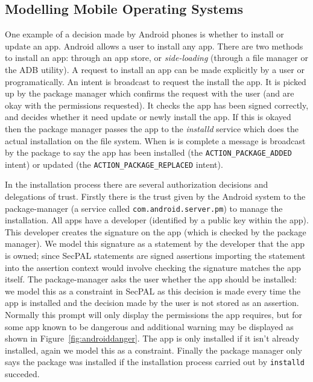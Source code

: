 \documentclass[a4paper]{article}
\begin{document}
\subsection{Modelling Mobile Operating Systems}
\label{sec:modellingmobileos}

One example of a decision made by Android phones is whether to install or update
an app.  Android allows a user to install any app.  There are two methods to
install an app: through an app store, or \emph{side-loading} (through a file
manager or the \ac{ADB} utility).  A request to install an app can be made
explicitly by a user or programatically.  An intent is broadcast to request the
install the app.  It is picked up by the package manager which confirms the
request with the user (and are okay with the permissions requested). It checks the
app has been signed correctly, and decides whether it need update or newly install
the app.  If this is okayed then the package manager passes the app to the
\emph{installd} service which does the actual installation on the file system.
When is is complete a message is broadcast by the package to say the app has
been installed (the \texttt{ACTION\_PACKAGE\_ADDED} intent) or updated (the
\texttt{ACTION\_PACKAGE\_REPLACED} intent).

In the installation process there are several authorization decisions and
delegations of trust.  Firstly there is the trust given by the Android system to
the package-manager (a service called \texttt{com.android.server.pm}) to manage
the installation.  All apps have a developer (identified by a public key within
the app).  This developer creates the signature on the app (which is checked by
the package manager).  We model this signature as a statement by the developer
that the app is owned; since SecPAL statements are signed assertions importing
the statement into the assertion context would involve checking the signature
matches the app itself.  The package-manager asks the user whether the app
should be installed: we model this as a constraint in SecPAL as this decision is
made every time the app is installed and the decision made by the user is not
stored as an assertion. Normally this prompt will only display the permissions
the app requires, but for some app known to be dangerous and additional warning
may be displayed as shown in Figure~\ref{fig:androiddanger}. The app is only installed if it isn't already
installed, again we model this as a constraint.  Finally the package manager
only says the package was installed if the installation process carried out by
\texttt{installd} succeded. 
\end{document}
